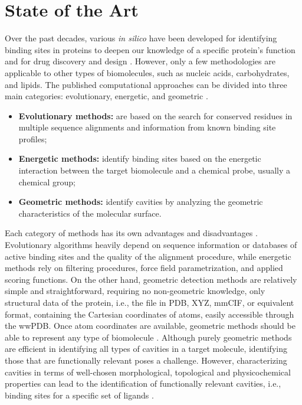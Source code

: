 \documentclass[Ingles]{phdthesis}
\def\ie{i.e.\onedot}
\begin{document}
\section{State of the Art \label{sec:state-of-the-art}}

Over the past decades, various \textit{in silico} have been developed for identifying binding sites in proteins to deepen our knowledge of a specific protein's function and for drug discovery and design \cite{liang1998}. However, only a few methodologies are applicable to other types of biomolecules, such as nucleic acids, carbohydrates, and lipids. The published computational approaches can be divided into three main categories: evolutionary, energetic, and geometric \cite{oliveira2014,simoes2017,guerra2019}.

\begin{itemize}
  \item \textbf{Evolutionary methods:} are based on the search for conserved residues in multiple sequence alignments and information from known binding site profiles;
  \item \textbf{Energetic methods:} identify binding sites based on the energetic interaction between the target biomolecule and a chemical probe, usually a chemical group;
  \item \textbf{Geometric methods:} identify cavities by analyzing the geometric characteristics of the molecular surface.
\end{itemize}

Each category of methods has its own advantages and disadvantages \cite{sotriffer2002,henrich2010,simoes2017}. Evolutionary algorithms heavily depend on sequence information or databases of active binding sites and the quality of the alignment procedure, while energetic methods rely on filtering procedures, force field parametrization, and applied scoring functions. On the other hand, geometric detection methods are relatively simple and straightforward, requiring no non-geometric knowledge, only structural data of the protein, \ie, the file in \ac{PDB}, XYZ, \ac{mmCIF}, or equivalent format, containing the Cartesian coordinates of atoms, easily accessible through the \ac{wwPDB}. Once atom coordinates are available, geometric methods should be able to represent any type of biomolecule \cite{henrich2010,oliveira2014,simoes2017}. Although purely geometric methods are efficient in identifying all types of cavities in a target molecule, identifying those that are functionally relevant poses a challenge. However, characterizing cavities in terms of well-chosen morphological, topological and physicochemical properties can lead to the identification of functionally relevant cavities, \ie, binding sites for a specific set of ligands \cite{sotriffer2002,henrich2010,liang1998,guerra2019}. 
\end{document}
